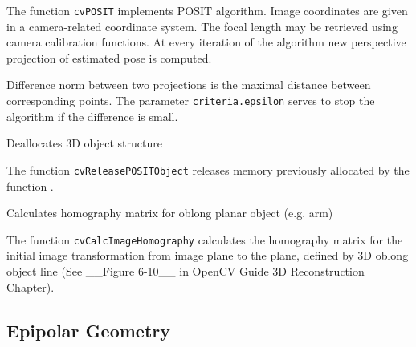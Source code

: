 The function \texttt{cvPOSIT} implements POSIT algorithm. Image coordinates are given in a camera-related coordinate system. The focal length may be retrieved using camera calibration functions. At every iteration of the algorithm new perspective projection of estimated pose is computed.

Difference norm between two projections is the maximal distance between corresponding points. The parameter \texttt{criteria.epsilon} serves to stop the algorithm if the difference is small.

\label{ReleasePOSITObject}

Deallocates 3D object structure


\begin{description}
\end{description}

The function \texttt{cvReleasePOSITObject} releases memory previously allocated by the function .


\label{CalcImageHomography}

Calculates homography matrix for oblong planar object (e.g. arm)


\begin{description}
\end{description}

The function \texttt{cvCalcImageHomography} calculates the homography matrix for the initial image transformation from image plane to the plane, defined by 3D oblong object line (See \_\_Figure 6-10\_\_ in OpenCV Guide 3D Reconstruction Chapter).


\subsection{Epipolar Geometry}

